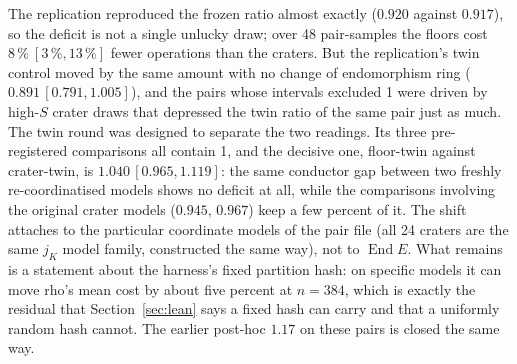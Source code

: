 \documentclass[10pt,a4paper]{article}
\newcommand{\End}{\operatorname{End}}
\newcommand{\artefact}[1]{\texttt{\small #1}}
\theoremstyle{remark}
\begin{document}
\begin{table}[t]
\centering\footnotesize
{}
\caption{Tier L and its two pre-registered follow-ups, arm
\texttt{rho.negation}, ratio of means with bootstrap 95\,\% intervals,
$384$ solves per side in each pooled cell ($768$ for L $+$ replication).
Source: \artefact{results/summary.md}, pooled rows \texttt{l},
\texttt{lr}, \texttt{l+lr}, \texttt{t} and their twin keys.}
\label{tab:L}
\end{table}

The replication reproduced the frozen ratio almost exactly
($0.920$ against $0.917$), so the deficit is not a single unlucky draw;
over 48 pair-samples the floors cost $8\,\%\ [3\,\%, 13\,\%]$ fewer
operations than the craters. But the replication's twin control moved by
the same amount with no change of endomorphism ring
($0.891\,[0.791, 1.005]$), and the pairs whose intervals excluded 1 were
driven by high-$S$ crater draws that depressed the twin ratio of the
same pair just as much. The twin round was designed to separate the two
readings. Its three pre-registered comparisons all contain 1, and the
decisive one, floor-twin against crater-twin, is $1.040\,[0.965, 1.119]$:
the same conductor gap between two freshly re-coordinatised models shows
no deficit at all, while the comparisons involving the original crater
models ($0.945$, $0.967$) keep a few percent of it. The shift attaches to
the particular coordinate models of the pair file (all 24 craters are
the same $j_K$ model family, constructed the same way), not to $\End E$.
What remains is a statement about the harness's fixed partition hash: on
specific models it can move rho's mean cost by about five percent at
$n = 384$, which is exactly the residual that Section~\ref{sec:lean}
says a fixed hash can carry and that a uniformly random hash cannot.
The earlier post-hoc $1.17$ on these pairs is closed the same way.
\end{document}
